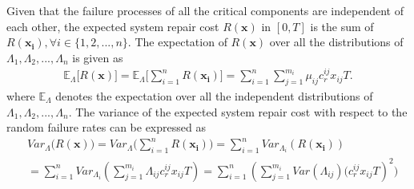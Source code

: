 \documentclass[10pt,a4paper]{article}
\begin{document}
Given that the failure processes of all the critical components are independent of each other, the expected system repair cost $R(\boldsymbol{x})$ in $[0,T]$ is the sum of $R(\boldsymbol{x_i}), \forall i \in \{1,2,...,n\}$. The expectation of $R(\boldsymbol{x})$ over all the distributions of $\Lambda_1,\Lambda_2,..., \Lambda_n$ is given as
\begin {eqnarray}
\mathbb{E}_{\Lambda} \bigg[ R(\boldsymbol{x}) \bigg]= \mathbb{E}_{\Lambda} \bigg[ \sum_{i=1}^{n}R(\boldsymbol{x_{i}}) \bigg]=\sum_{i=1}^{n}\sum_{j=1}^{m_{i}}{\mu_{ij}c_r^{ij}x_{ij}}T.
\end {eqnarray}
where $\mathbb{E}_{\Lambda}$ denotes the expectation over all the independent distributions of $\Lambda_1,\Lambda_2,..., \Lambda_n$.
The variance of the expected system repair cost with respect to the random failure rates can be expressed as
\begin {eqnarray}
& Var_{\Lambda} \bigg( R(\boldsymbol{x}) \bigg)  =Var_{\Lambda} \bigg( \sum_{i=1}^{n}R(\boldsymbol{x_{i}}) \bigg)
= \sum_{i=1}^{n} Var_{\Lambda_i}(R(\boldsymbol{x_i})) \nonumber \\
 & = \sum_{i=1}^{n} Var_{\Lambda_i}(\sum_{j=1}^{m_{i}}{\Lambda_{ij}c_r^{ij}x_{ij}}T)
= \sum_{i=1}^{n} (\sum_{j=1}^{m_{i}}{Var(\Lambda_{ij})(c_r^{ij}x_{ij}}T)^2)
\end {eqnarray}
\end{document}
